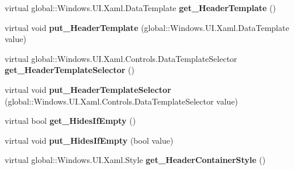 \begin{DoxyCompactItemize}
\item 
\mbox{\label{class_windows_1_1_u_i_1_1_xaml_1_1_controls_1_1_group_style_af2b42ad3678973b6c5ffc2da772855d9}} 
virtual global\+::\+Windows.\+U\+I.\+Xaml.\+Data\+Template {\bfseries get\+\_\+\+Header\+Template} ()
\item 
\mbox{\label{class_windows_1_1_u_i_1_1_xaml_1_1_controls_1_1_group_style_abe3e5ea2a3be2465b15f097703102cd2}} 
virtual void {\bfseries put\+\_\+\+Header\+Template} (global\+::\+Windows.\+U\+I.\+Xaml.\+Data\+Template value)
\item 
\mbox{\label{class_windows_1_1_u_i_1_1_xaml_1_1_controls_1_1_group_style_a146db53a3fc94e4e3c9433f3c199f1ff}} 
virtual global\+::\+Windows.\+U\+I.\+Xaml.\+Controls.\+Data\+Template\+Selector {\bfseries get\+\_\+\+Header\+Template\+Selector} ()
\item 
\mbox{\label{class_windows_1_1_u_i_1_1_xaml_1_1_controls_1_1_group_style_a3b0221f01ff571dde0bf2c5bd0eeca2d}} 
virtual void {\bfseries put\+\_\+\+Header\+Template\+Selector} (global\+::\+Windows.\+U\+I.\+Xaml.\+Controls.\+Data\+Template\+Selector value)
\item 
\mbox{\label{class_windows_1_1_u_i_1_1_xaml_1_1_controls_1_1_group_style_a3b73f89d90026b986f6e55bc0566aedf}} 
virtual bool {\bfseries get\+\_\+\+Hides\+If\+Empty} ()
\item 
\mbox{\label{class_windows_1_1_u_i_1_1_xaml_1_1_controls_1_1_group_style_aa40a04f641abe85a825e92cf3eb7b442}} 
virtual void {\bfseries put\+\_\+\+Hides\+If\+Empty} (bool value)
\item 
\mbox{\label{class_windows_1_1_u_i_1_1_xaml_1_1_controls_1_1_group_style_a3c12aa3cefaa3b60dc882ca5393ec88f}} 
virtual global\+::\+Windows.\+U\+I.\+Xaml.\+Style {\bfseries get\+\_\+\+Header\+Container\+Style} ()
\item 

\end{DoxyCompactItemize}
